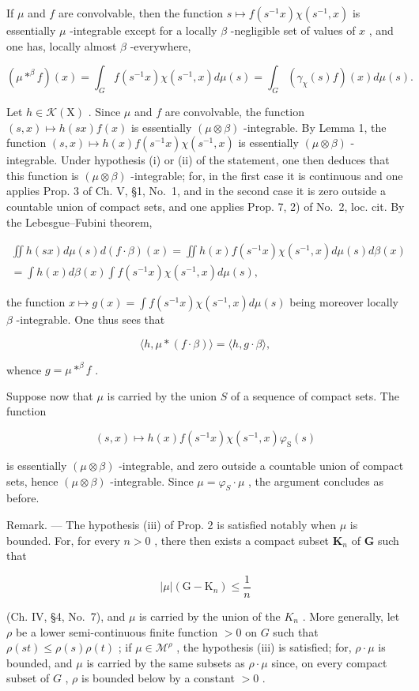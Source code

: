 If \(\mu\) and \(f\) are convolvable, then the function \(s \mapsto f(s^{-1}x)\chi(s^{-1}, x)\) is essentially \(\mu\) -integrable except for a locally \(\beta\) -negligible set of values of \(x\) , and one has, locally almost \(\beta\) -everywhere,

\[
(\mu * ^ {\beta} f) (x) = \int_ {G} f (s ^ {- 1} x) \chi (s ^ {- 1}, x) d \mu (s) = \int_ {G} (\gamma_ {\chi} (s) f) (x) d \mu (s).\tag{3}
\]

Let \(h \in \mathcal{K}(\mathrm{X})\) . Since \(\mu\) and \(f\) are convolvable, the function \((s, x) \mapsto h(sx)f(x)\) is essentially \((\mu \otimes \beta)\) -integrable. By Lemma 1, the function \((s, x) \mapsto h(x)f(s^{-1}x)\chi(s^{-1}, x)\) is essentially \((\mu \otimes \beta)\) -integrable. Under hypothesis (i) or (ii) of the statement, one then deduces that this function is \((\mu \otimes \beta)\) -integrable; for, in the first case it is continuous and one applies Prop. 3 of Ch. V, §1, No.~1, and in the second case it is zero outside a countable union of compact sets, and one applies Prop. 7, 2) of No.~2, loc. cit. By the Lebesgue--Fubini theorem,

\[
\begin{array}{c} \iint h (s x) d \mu (s) d (f \cdot \beta) (x) = \iint h (x) f (s ^ {- 1} x) \chi (s ^ {- 1}, x) d \mu (s) d \beta (x) \\ = \int h (x) d \beta (x) \int f (s ^ {- 1} x) \chi (s ^ {- 1}, x) d \mu (s), \end{array}
\]

the function \(x \mapsto g(x) = \int f(s^{-1}x)\chi (s^{-1},x)d\mu (s)\) being moreover locally \(\beta\) -integrable. One thus sees that

\[
\langle h, \mu * (f \cdot \beta) \rangle = \langle h, g \cdot \beta \rangle ,
\]

whence \(g = \mu *^{\beta} f\) .

Suppose now that \(\mu\) is carried by the union \(S\) of a sequence of compact sets. The function

\[
(s, x) \mapsto h (x) f (s ^ {- 1} x) \chi (s ^ {- 1}, x) \varphi_ {\mathrm{S}} (s)
\]

is essentially \((\mu\otimes\beta)\) -integrable, and zero outside a countable union of compact sets, hence \((\mu\otimes\beta)\) -integrable. Since \(\mu=\varphi_{S}\cdot\mu\) , the argument concludes as before.

Remark. --- The hypothesis (iii) of Prop. 2 is satisfied notably when \(\mu\) is bounded. For, for every \(n > 0\) , there then exists a compact subset \(\mathbf{K}_n\) of \(\mathbf{G}\) such that

\[
| \mu | (\mathrm{G} - \mathrm{K} _ {n}) \leqslant \frac {1}{n}
\]

(Ch. IV, §4, No.~7), and \(\mu\) is carried by the union of the \(K_{n}\) . More generally, let \(\rho\) be a lower semi-continuous finite function \(>0\) on \(G\) such that \(\rho(st) \leqslant \rho(s)\rho(t)\) ; if \(\mu \in \mathcal{M}^{\rho}\) , the hypothesis (iii) is satisfied; for, \(\rho \cdot \mu\) is bounded, and \(\mu\) is carried by the same subsets as \(\rho \cdot \mu\) since, on every compact subset of \(G\) , \(\rho\) is bounded below by a constant \(>0\) .

